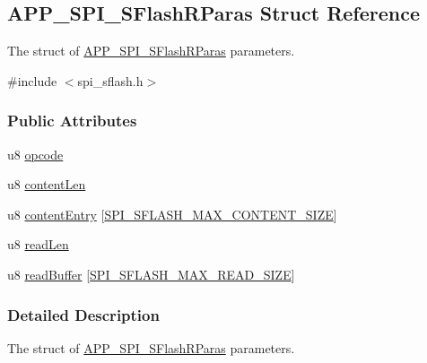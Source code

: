 \hypertarget{struct_a_p_p___s_p_i___s_flash_r_paras}{}\subsection{A\+P\+P\+\_\+\+S\+P\+I\+\_\+\+S\+Flash\+R\+Paras Struct Reference}
\label{struct_a_p_p___s_p_i___s_flash_r_paras}


The struct of \hyperlink{struct_a_p_p___s_p_i___s_flash_r_paras}{A\+P\+P\+\_\+\+S\+P\+I\+\_\+\+S\+Flash\+R\+Paras} parameters.  




{\ttfamily \#include $<$spi\+\_\+sflash.\+h$>$}

\subsubsection*{Public Attributes}
\begin{DoxyCompactItemize}
\item 
u8 \hyperlink{struct_a_p_p___s_p_i___s_flash_r_paras_a9daa542bbfa8cec392dec36aa67deabc}{opcode}
\item 
u8 \hyperlink{struct_a_p_p___s_p_i___s_flash_r_paras_a4258fbc7f50da8ba421fe306771eb46e}{content\+Len}
\item 
u8 \hyperlink{struct_a_p_p___s_p_i___s_flash_r_paras_a12491865b160f4b4dce2bfb780d210d2}{content\+Entry} \mbox{[}\hyperlink{group___s_p_i___s_f_l_a_s_h___m_a_x_gadea000355b05a5b9cb84744f2707b8af}{S\+P\+I\+\_\+\+S\+F\+L\+A\+S\+H\+\_\+\+M\+A\+X\+\_\+\+C\+O\+N\+T\+E\+N\+T\+\_\+\+S\+I\+ZE}\mbox{]}
\item 
u8 \hyperlink{struct_a_p_p___s_p_i___s_flash_r_paras_a8923c378d042bdf8d029e504f89f5a7b}{read\+Len}
\item 
u8 \hyperlink{struct_a_p_p___s_p_i___s_flash_r_paras_aeceaeb193536f7f884aed96a7abf7a3e}{read\+Buffer} \mbox{[}\hyperlink{group___s_p_i___s_f_l_a_s_h___m_a_x_gad4861efe548a3e40dc9d8b29eb74e047}{S\+P\+I\+\_\+\+S\+F\+L\+A\+S\+H\+\_\+\+M\+A\+X\+\_\+\+R\+E\+A\+D\+\_\+\+S\+I\+ZE}\mbox{]}
\end{DoxyCompactItemize}


\subsubsection{Detailed Description}
The struct of \hyperlink{struct_a_p_p___s_p_i___s_flash_r_paras}{A\+P\+P\+\_\+\+S\+P\+I\+\_\+\+S\+Flash\+R\+Paras} parameters. 

